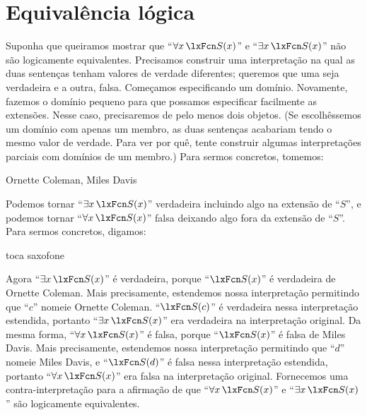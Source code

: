 \section{Equivalência lógica}
Suponha que queiramos mostrar que \textquotedblleft $\forall x\, \atom{S}{x}$\textquotedblright{} e \textquotedblleft $\exists x\, \atom{S}{x}$\textquotedblright{} não são logicamente equivalentes. Precisamos construir uma interpretação na qual as duas sentenças tenham valores de verdade diferentes; queremos que uma seja verdadeira e a outra, falsa. Começamos especificando um domínio. Novamente, fazemos o domínio pequeno para que possamos especificar facilmente as extensões. Nesse caso, precisaremos de pelo menos dois objetos. (Se escolhêssemos um domínio com apenas um membro, as duas sentenças acabariam tendo o mesmo valor de verdade. Para ver por quê, tente construir algumas interpretações parciais com domínios de um membro.) Para sermos concretos, tomemos:
	\begin{ekey}
\item[\text{domínio}] Ornette Coleman, Miles Davis
	\end{ekey}
Podemos tornar \textquotedblleft $\exists x\, \atom{S}{x}$\textquotedblright{} verdadeira incluindo algo na extensão de \textquotedblleft $S$\textquotedblright{}, e podemos tornar \textquotedblleft $\forall x\, \atom{S}{x}$\textquotedblright{} falsa deixando algo fora da extensão de \textquotedblleft $S$\textquotedblright{}. Para sermos concretos, digamos:
	\begin{ekey}
\item[\atom{S}{x}]  toca saxofone
	\end{ekey}
Agora \textquotedblleft $\exists x\, \atom{S}{x}$\textquotedblright{} é verdadeira, porque \textquotedblleft $\atom{S}{x}$\textquotedblright{} é verdadeira de Ornette Coleman. Mais precisamente, estendemos nossa interpretação permitindo que \textquotedblleft $c$\textquotedblright{} nomeie Ornette Coleman. \textquotedblleft $\atom{S}{c}$\textquotedblright{} é verdadeira nessa interpretação estendida, portanto \textquotedblleft $\exists x\, \atom{S}{x}$\textquotedblright{} era verdadeira na interpretação original. Da mesma forma, \textquotedblleft $\forall x\, \atom{S}{x}$\textquotedblright{} é falsa, porque \textquotedblleft $\atom{S}{x}$\textquotedblright{} é falsa de Miles Davis. Mais precisamente, estendemos nossa interpretação permitindo que \textquotedblleft $d$\textquotedblright{} nomeie Miles Davis, e \textquotedblleft $\atom{S}{d}$\textquotedblright{} é falsa nessa interpretação estendida, portanto \textquotedblleft $\forall x\, \atom{S}{x}$\textquotedblright{} era falsa na interpretação original. Fornecemos uma contra-interpretação para a afirmação de que \textquotedblleft $\forall x\, \atom{S}{x}$\textquotedblright{} e \textquotedblleft $\exists x\, \atom{S}{x}$\textquotedblright{} são logicamente equivalentes.

